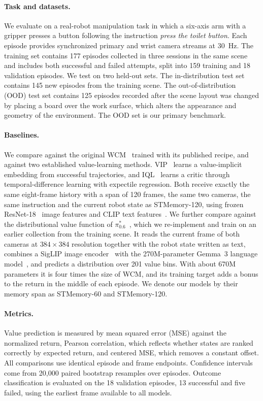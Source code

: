 \documentclass[10pt,a4paper]{article}
\begin{document}
\paragraph{Task and datasets.}
We evaluate on a real-robot manipulation task in which a six-axis arm with a gripper presses a button following the instruction \emph{press the toilet button}. Each episode provides synchronized primary and wrist camera streams at 30~Hz. The training set contains 177 episodes collected in three sessions in the same scene and includes both successful and failed attempts, split into 159 training and 18 validation episodes. We test on two held-out sets. The in-distribution test set contains 145 new episodes from the training scene. The out-of-distribution (OOD) test set contains 125 episodes recorded after the scene layout was changed by placing a board over the work surface, which alters the appearance and geometry of the environment. The OOD set is our primary benchmark.

\paragraph{Baselines.}
We compare against the original WCM~\citep{fei2026wcm} trained with its published recipe, and against two established value-learning methods. VIP~\citep{ma2023vip} learns a value-implicit embedding from successful trajectories, and IQL~\citep{kostrikov2022iql} learns a critic through temporal-difference learning with expectile regression. Both receive exactly the same eight-frame history with a span of 120 frames, the same two cameras, the same instruction and the current robot state as STMemory-120, using frozen ResNet-18~\citep{he2016resnet} image features and CLIP text features~\citep{radford2021clip}. We further compare against the distributional value function of $\pi^{*}_{0.6}$~\citep{pistar06}, which we re-implement and train on an earlier collection from the training scene. It reads the current frame of both cameras at $384\times384$ resolution together with the robot state written as text, combines a SigLIP image encoder~\citep{zhai2023siglip} with the 270M-parameter Gemma~3 language model~\citep{gemma2025gemma3}, and predicts a distribution over 201 value bins. With about 670M parameters it is four times the size of WCM, and its training target adds a bonus to the return in the middle of each episode. We denote our models by their memory span as STMemory-60 and STMemory-120.

\paragraph{Metrics.}
Value prediction is measured by mean squared error (MSE) against the normalized return, Pearson correlation, which reflects whether states are ranked correctly by expected return, and centered MSE, which removes a constant offset. All comparisons use identical episode and frame endpoints. Confidence intervals come from 20,000 paired bootstrap resamples over episodes. Outcome classification is evaluated on the 18 validation episodes, 13 successful and five failed, using the earliest frame available to all models.
\end{document}
